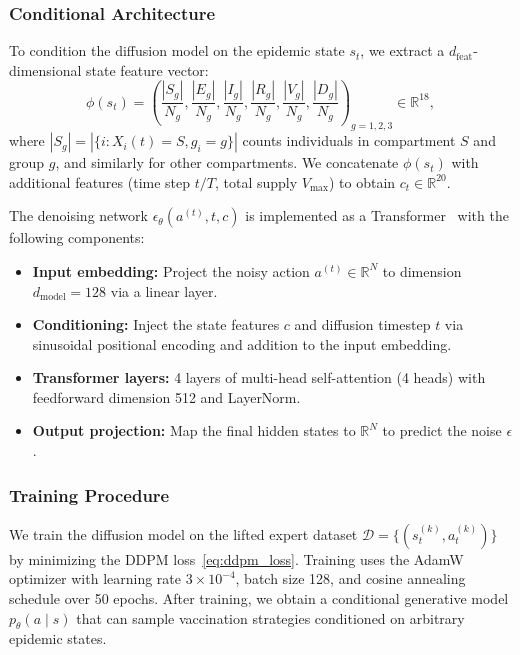 \subsubsection{Conditional Architecture}

To condition the diffusion model on the epidemic state $s_t$, we extract a
$d_{\text{feat}}$-dimensional state feature vector:
\begin{equation}
\phi(s_t) = \left(
\frac{|S_g|}{N_g}, \frac{|E_g|}{N_g}, \frac{|I_g|}{N_g}, \frac{|R_g|}{N_g},
\frac{|V_g|}{N_g}, \frac{|D_g|}{N_g}
\right)_{g=1,2,3} \in \mathbb{R}^{18},
\end{equation}
where $|S_g| = |\{i : X_i(t)=S, g_i=g\}|$ counts individuals in compartment $S$ and
group $g$, and similarly for other compartments. We concatenate $\phi(s_t)$ with
additional features (time step $t/T$, total supply $V_{\max}$) to obtain
$c_t \in \mathbb{R}^{20}$.

The denoising network $\epsilon_\theta(a^{(t)}, t, c)$ is implemented as a
Transformer~\citep{vaswani2017attention} with the following components:
\begin{itemize}
    \item \textbf{Input embedding:} Project the noisy action $a^{(t)} \in \mathbb{R}^N$
    to dimension $d_{\text{model}}=128$ via a linear layer.

    \item \textbf{Conditioning:} Inject the state features $c$ and diffusion timestep $t$
    via sinusoidal positional encoding and addition to the input embedding.

    \item \textbf{Transformer layers:} 4 layers of multi-head self-attention (4 heads)
    with feedforward dimension 512 and LayerNorm.

    \item \textbf{Output projection:} Map the final hidden states to $\mathbb{R}^N$
    to predict the noise $\epsilon$.
\end{itemize}

\subsubsection{Training Procedure}

We train the diffusion model on the lifted expert dataset $\mathcal{D} =
\{(s_t^{(k)}, a_t^{(k)})\}$ by minimizing the DDPM loss~\eqref{eq:ddpm_loss}. Training
uses the AdamW optimizer with learning rate $3 \times 10^{-4}$, batch size 128, and
cosine annealing schedule over 50 epochs. After training, we obtain a conditional
generative model $p_\theta(a \mid s)$ that can sample vaccination strategies conditioned
on arbitrary epidemic states.

